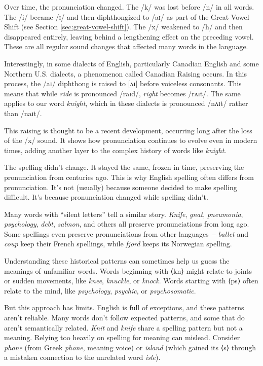 Over time, the pronunciation changed. The /k/ was lost before /n/ in all words. The /i/ became /ɪ/ and then diphthongized to /aɪ/ as part of the Great Vowel Shift (see Section \ref{sec:great-vowel-shift}). The /x/ weakened to /h/ and then disappeared entirely, leaving behind a lengthening effect on the preceding vowel. These are all regular sound changes that affected many words in the language.

Interestingly, in some dialects of English, particularly Canadian English and some Northern U.S. dialects, a phenomenon called Canadian Raising occurs. In this process, the /aɪ/ diphthong is raised to [ʌɪ] before voiceless consonants. This means that while \textit{ride} is pronounced /raɪd/, \textit{right} becomes /rʌɪt/. The same applies to our word \textit{knight}, which in these dialects is pronounced /nʌɪt/ rather than /naɪt/.

This raising is thought to be a recent development, occurring long after the loss of the /x/ sound. It shows how pronunciation continues to evolve even in modern times, adding another layer to the complex history of words like \textit{knight}.

The spelling didn't change. It stayed the same, frozen in time, preserving the pronunciation from centuries ago. This is why English spelling often differs from pronunciation. It's not (usually) because someone decided to make spelling difficult. It's because pronunciation changed while spelling didn't.

Many words with ``silent letters'' tell a similar story. \textit{Knife}, \textit{gnat}, \textit{pneumonia}, \textit{psychology}, \textit{debt}, \textit{salmon}, and others all preserve pronunciations from long ago. Some spellings even preserve pronunciations from other languages~-- \textit{ballet} and \textit{coup} keep their French spellings, while \textit{fjord} keeps its Norwegian spelling.

Understanding these historical patterns can sometimes help us guess the meanings of unfamiliar words. Words beginning with ⟨kn⟩ might relate to joints or sudden movements, like \textit{knee}, \textit{knuckle}, or \textit{knock}. Words starting with ⟨ps⟩ often relate to the mind, like \textit{psychology}, \textit{psychic}, or \textit{psychosomatic}.

But this approach has limits. English is full of exceptions, and these patterns aren't reliable. Many words don't follow expected patterns, and some that do aren't semantically related. \textit{Knit} and \textit{knife} share a spelling pattern but not a meaning. Relying too heavily on spelling for meaning can mislead. Consider \textit{phone} (from Greek \textit{phōnē}, meaning voice) or \textit{island} (which gained its ⟨s⟩ through a mistaken connection to the unrelated word \textit{isle}).


